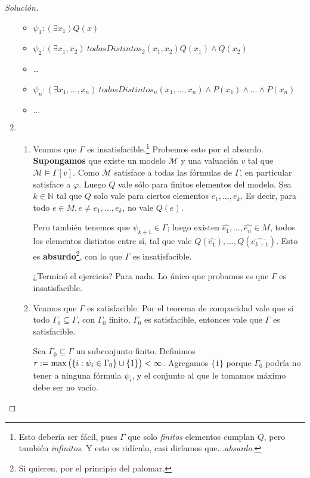 \documentclass[10pt,a4paper]{article}
\def\key#1{\{#1\}}
\def\N{\mathbb{N}}
\def\m{\mathcal{M}}
\def\p{\psi}
\newenvironment{solution}
  {\renewcommand\qedsymbol{$\blacksquare$}\begin{proof}[Solución]}
  {\end{proof}}
\begin{document}
\begin{solution}
\begin{enumerate}

\begin{itemize}
	\item $\p_1: (\exists x_1) Q(x)$
	\item $\p_2: (\exists x_1, x_2)\ todosDistintos_2(x_1,x_2) Q(x_1) \land Q(x_2)$
	\item \dots
	\item $\p_n : (\exists x_1,\dots,x_n)\ todosDistintos_n(x_1,\dots,x_n) \land P(x_1) \land \dots \land P(x_n)$
	\item $\dots$
\end{itemize}


  \item 
  \begin{enumerate}[label=\alph*)]
  	\item Veamos que $\Gamma$ es insatisfacible.\footnote{Esto debería ser fácil, pues $\Gamma$  que solo \emph{finitos} elementos cumplan $Q$, pero también \emph{infinitos}. Y esto es ridículo, casi diríamos que...\emph{absurdo}.} Probemos esto por el absurdo.
  	 \textbf{Supongamos} que existe un modelo $\m$ y una valuación $v$ tal que $\m \vDash \Gamma[v]$. Como $\m$ satisface a todas las fórmulas de $\Gamma$, en particular satisface a $\varphi$. Luego $Q$ vale sólo para finitos elementos del modelo. Sea $k\in \N$ tal que $Q$ solo vale para ciertos elementos $e_1,\dots,e_k$. Es decir, para todo $e \in M, e \neq e_1,\dots, e_k$, no vale $Q(e)$.  	
  	
  	 Pero también tenemos que $\p_{k+1} \in \Gamma$; luego existen $\hat{e_1},\dots,\hat{e_n}\in M$, todos los elementos distintos entre sí, tal que vale $Q(\hat{e_1}),\dots, Q(\hat{e_{k+1}})$. Esto es \textbf{absurdo}\footnote{Si quieren, por el principio del palomar.}, con lo que $\Gamma$ es insatisfacible.
  	 
  	 ¿Terminó el ejercicio? Para nada. Lo único que probamos es que $\Gamma$ es insatisfacible.
  	 
  	 \item Veamos que $\Gamma$ es satisfacible. Por el teorema de compacidad vale que si todo $\Gamma_0 \subseteq \Gamma$, con $\Gamma_0$ finito, $\Gamma_0$ es satisfacible, entonces vale que $\Gamma$ es satisfacible.
  	 
  	 Sea $\Gamma_0 \subseteq \Gamma$ un subconjunto finito.
  	  Definimos $r := \max\big{(}\key{i : \p_i \in \Gamma_0} \cup \key{1}\big{)} < \infty$. Agregamos $\key{1}$ porque $\Gamma_0$ podría no tener a ninguna fórmula $\p_i$, y el conjunto al que le tomamos máximo debe ser no vacío.
  	  

\end{enumerate}
\end{enumerate}
\end{solution}
\end{document}
